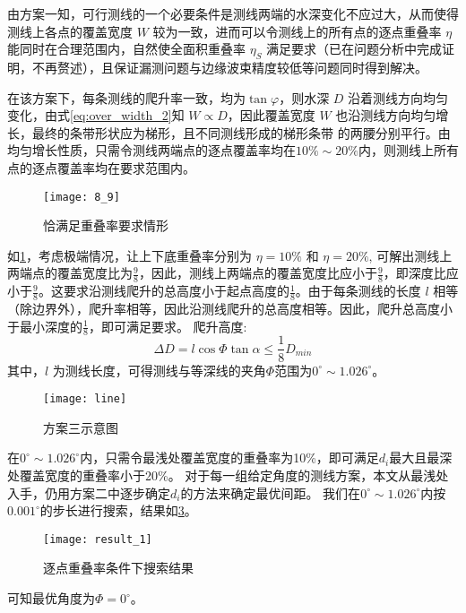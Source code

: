 \documentclass[withoutpreface,bwprint]{cumcmthesis} %
\begin{document}
        由方案一知，可行测线的一个必要条件是测线两端的水深变化不应过大，从而使得测线上各点的覆盖宽度 $W$ 较为一致，进而可以令测线上的所有点的逐点重叠率 $\eta$
        能同时在合理范围内，自然使全面积重叠率 $\eta_S$ 满足要求（已在问题分析中完成证明，不再赘述），且保证漏测问题与边缘波束精度较低等问题同时得到解决。
        
        
        在该方案下，每条测线的爬升率一致，均为$\tan\varphi$，则水深 $D$ 沿着测线方向均匀变化，由式\cref{eq:over_width_2}知 $W \propto D$，因此覆盖宽度 $W$ 也沿测线方向均匀增长，最终的条带形状应为梯形，且不同测线形成的梯形条带
        的两腰分别平行。由均匀增长性质，只需令测线两端点的逐点覆盖率均在$10\%\sim20\%$内，则测线上所有点的逐点覆盖率均在要求范围内。

        \begin{figure}[H]
            \centering
            \texttt{[image: 8\_9]}
            \caption{恰满足重叠率要求情形}
            \label{fig:8_9}
        \end{figure}
        如\cref{fig:8_9}，考虑极端情况，让上下底重叠率分别为 $\eta = 10\%$ 和 $\eta = 20\%$, 
        可解出测线上两端点的覆盖宽度比为$\frac{9}{8}$，因此，测线上两端点的覆盖宽度比应小于$\frac{9}{8}$，即深度比应小于$\frac{9}{8}$。这要求沿测线爬升的总高度小于起点高度的$\frac{1}{8}$。由于每条测线的长度 $l$ 相等
        （除边界外），爬升率相等，因此沿测线爬升的总高度相等。因此，爬升总高度小于最小深度的$\frac{1}{8}$，即可满足要求。
        爬升高度:
        \begin{equation}
            \Delta D = l\cos\Phi\tan\alpha \leq \frac{1}{8}D_{min}
            \label{Delta_D1}
        \end{equation}
        其中，$l$ 为测线长度，可得测线与等深线的夹角$\Phi$范围为$0^\circ \sim 1.026^\circ$。
        \begin{figure}[H]
            \centering
            \texttt{[image: line]}
            \caption{方案三示意图}
            \label{fig:line}
        \end{figure}
        在$0^\circ \sim 1.026^\circ$内，只需令最浅处覆盖宽度的重叠率为10\%，即可满足$d_i$最大且最深处覆盖宽度的重叠率小于20\%。
        对于每一组给定角度的测线方案，本文从最浅处入手，仍用方案二中逐步确定$d_i$的方法来确定最优间距。
        我们在$0^\circ \sim 1.026^\circ$内按$0.001^\circ$的步长进行搜索，结果如\cref{fig:result_1}。
        \begin{figure}[H]
            \centering
            \texttt{[image: result\_1]}
            \caption{逐点重叠率条件下搜索结果}
            \label{fig:result_1}
        \end{figure}
        可知最优角度为$\Phi = 0^\circ$。
        
\end{document}

